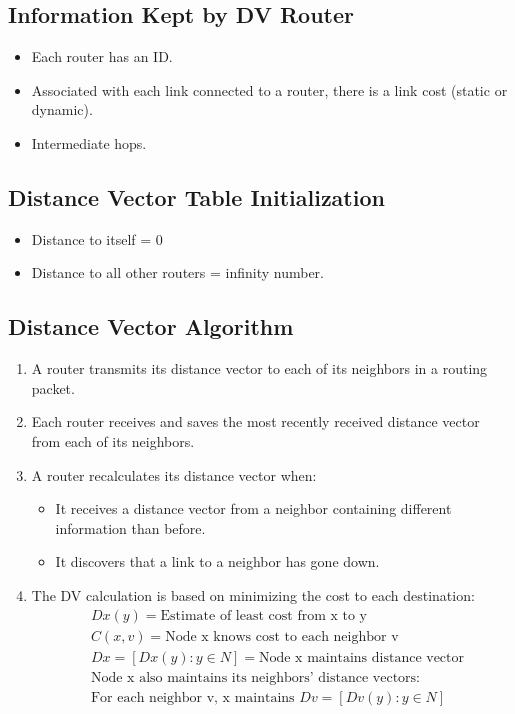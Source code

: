 \documentclass{korigamik}
\begin{document}
\subsection{Information Kept by DV Router}
\begin{itemize}
	\item Each router has an ID.
	\item Associated with each link connected to a router, there is a link cost
	      (static or dynamic).
	\item Intermediate hops.
\end{itemize}

\subsection{Distance Vector Table Initialization}
\begin{itemize}
	\item Distance to itself = 0
	\item Distance to all other routers = infinity number.
\end{itemize}

\subsection{Distance Vector Algorithm}
\begin{enumerate}
	\item A router transmits its distance vector to each of its neighbors in a
	      routing packet.
	\item Each router receives and saves the most recently received distance
	      vector from each of its neighbors.
	\item A router recalculates its distance vector when:
	      \begin{itemize}
		      \item It receives a distance vector from a neighbor containing
		            different information than before.
		      \item It discovers that a link to a neighbor has gone down.
	      \end{itemize}
	\item The DV calculation is based on minimizing the cost to each destination:
	      \begin{align*}
		       & Dx(y) = \text{Estimate of least cost from x to y}               \\
		       & C(x,v) = \text{Node x knows cost to each neighbor v}            \\
		       & Dx = [Dx(y): y \in N] = \text{Node x maintains distance vector} \\
		       & \text{Node x also maintains its neighbors' distance vectors:}   \\
		       & \text{For each neighbor v, x maintains } Dv = [Dv(y): y \in N]
	      \end{align*}
\end{enumerate}
\end{document}

